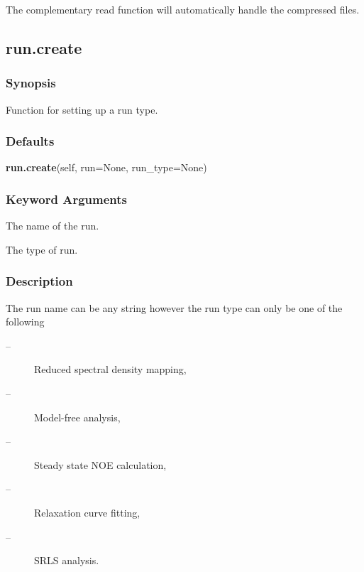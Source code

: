 The complementary read function will automatically handle the compressed files.




\newpage

\subsection{run.create}


\subsubsection{Synopsis}

Function for setting up a run type.



\subsubsection{Defaults}

\textsf{\textbf{run.create}(self, run=None, run\_type=None)}


\subsubsection{Keyword Arguments}

  The name of the run. 

  The type of run. 




\subsubsection{Description}

The run name can be any string however the run type can only be one of the following


\begin{description}
\item[ --]  Reduced spectral density mapping, 
\item[ --]  Model-free analysis, 
\item[ --]  Steady state NOE calculation, 
\item[ --]  Relaxation curve fitting, 
\item[ --]  SRLS analysis. 
\end{description}



